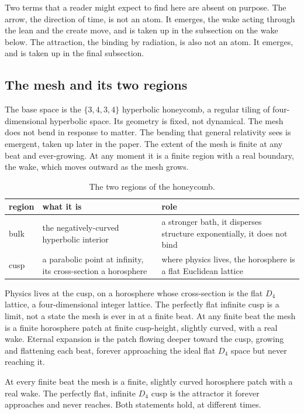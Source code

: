Two terms that a reader might expect to find here are absent on purpose. The arrow, the direction of time, is not an atom. It emerges, the wake acting through the lean and the create move, and is taken up in the subsection on the wake below. The attraction, the binding by radiation, is also not an atom. It emerges, and is taken up in the final subsection.

\subsection{The mesh and its two regions}

The base space is the $\{3,4,3,4\}$ hyperbolic honeycomb, a regular tiling of four-dimensional hyperbolic space. Its geometry is fixed, not dynamical. The mesh does not bend in response to matter. The bending that general relativity sees is emergent, taken up later in the paper. The extent of the mesh is finite at any beat and ever-growing. At any moment it is a finite region with a real boundary, the wake, which moves outward as the mesh grows.

\begin{table}[ht]
\centering
\begin{tabular}{@{}lll@{}}
\toprule
region & what it is & role \\
\midrule
bulk & the negatively-curved hyperbolic interior & a stronger bath, it disperses structure exponentially, it does not bind \\
cusp & a parabolic point at infinity, its cross-section a horosphere & where physics lives, the horosphere is a flat Euclidean lattice \\
\bottomrule
\end{tabular}
\caption{The two regions of the honeycomb.}
\label{tab:regions}
\end{table}

Physics lives at the cusp, on a horosphere whose cross-section is the flat $D_4$ lattice, a four-dimensional integer lattice. The perfectly flat infinite cusp is a limit, not a state the mesh is ever in at a finite beat. At any finite beat the mesh is a finite horosphere patch at finite cusp-height, slightly curved, with a real wake. Eternal expansion is the patch flowing deeper toward the cusp, growing and flattening each beat, forever approaching the ideal flat $D_4$ space but never reaching it.

\begin{principle}
At every finite beat the mesh is a finite, slightly curved horosphere patch with a real wake. The perfectly flat, infinite $D_4$ cusp is the attractor it forever approaches and never reaches. Both statements hold, at different times.
\end{principle}

